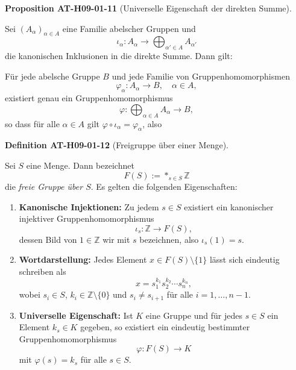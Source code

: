 \documentclass[10pt, letterpaper]{article}
\newcommand{\CustomHeading}[3]{%
  \par\medskip\noindent%
  \textbf{#1 #2} \textnormal{(#3)}.\enskip%
}
\newenvironment{DEF}[2]{\CustomHeading{Definition}{#1}{#2}}{}
\newenvironment{PROP}[2]{\CustomHeading{Proposition}{#1}{#2}}{}
\begin{document}
\begin{PROP}{AT-H09-01-11}{Universelle Eigenschaft der direkten Summe}
Sei $(A_\alpha)_{\alpha \in A}$ eine Familie abelscher Gruppen und
\[
\iota_\alpha : A_\alpha \rightarrow \bigoplus_{\alpha' \in A} A_{\alpha'}
\]
die kanonischen Inklusionen in die direkte Summe. Dann gilt:

Für jede abelsche Gruppe $B$ und jede Familie von Gruppenhomomorphismen
\[
\varphi_\alpha : A_\alpha \rightarrow B, \quad \alpha \in A,
\]
existiert genau ein Gruppenhomomorphismus
\[
\varphi : \bigoplus_{\alpha \in A} A_\alpha \rightarrow B,
\]
so dass für alle $\alpha \in A$ gilt $\varphi \circ \iota_\alpha = \varphi_\alpha$, also
\begin{center}
\end{center}
\end{PROP}

\begin{DEF}{AT-H09-01-12}{Freigruppe über einer Menge}
Sei $S$ eine Menge. Dann bezeichnet
\[
F(S) := *_{s \in S} \mathbb{Z}
\]
die \emph{freie Gruppe über $S$}. Es gelten die folgenden Eigenschaften:

\begin{enumerate}[label=(\roman*)]
  \item \textbf{Kanonische Injektionen:}  
  Zu jedem $s \in S$ existiert ein kanonischer injektiver Gruppenhomomorphismus
  \[
  \iota_s : \mathbb{Z} \rightarrow F(S),
  \]
  dessen Bild von $1 \in \mathbb{Z}$ wir mit $s$ bezeichnen, also $\iota_s(1) = s$.

  \item \textbf{Wortdarstellung:}  
  Jedes Element $x \in F(S) \setminus \{1\}$ lässt sich eindeutig schreiben als
  \[
  x = s_1^{k_1} s_2^{k_2} \cdots s_n^{k_n},
  \]
  wobei $s_i \in S$, $k_i \in \mathbb{Z} \setminus \{0\}$ und $s_i \neq s_{i+1}$ für alle $i = 1, \dots, n-1$.

  \item \textbf{Universelle Eigenschaft:}  
  Ist $K$ eine Gruppe und für jedes $s \in S$ ein Element $k_s \in K$ gegeben, so existiert ein eindeutig bestimmter Gruppenhomomorphismus
  \[
  \varphi : F(S) \longrightarrow K
  \]
  mit $\varphi(s) = k_s$ für alle $s \in S$.
\end{enumerate}
\end{DEF}
\end{document}
